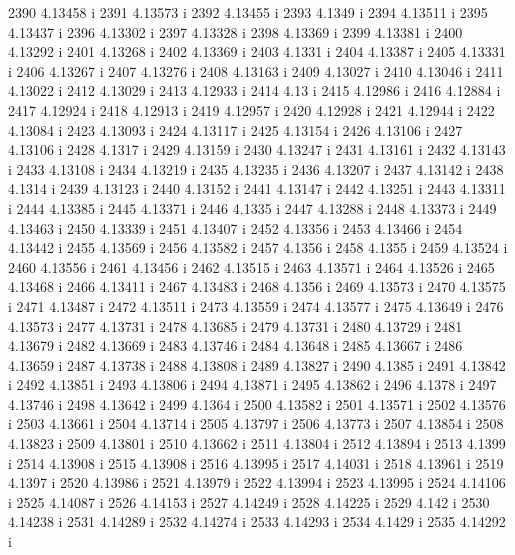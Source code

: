  2390  4.13458  i
 2391  4.13573  i
 2392  4.13455  i
 2393  4.1349  i
 2394  4.13511  i
 2395  4.13437  i
 2396  4.13302  i
 2397  4.13328  i
 2398  4.13369  i
 2399  4.13381  i
 2400  4.13292  i
 2401  4.13268  i
 2402  4.13369  i
 2403  4.1331  i
 2404  4.13387  i
 2405  4.13331  i
 2406  4.13267  i
 2407  4.13276  i
 2408  4.13163  i
 2409  4.13027  i
 2410  4.13046  i
 2411  4.13022  i
 2412  4.13029  i
 2413  4.12933  i
 2414  4.13  i
 2415  4.12986  i
 2416  4.12884  i
 2417  4.12924  i
 2418  4.12913  i
 2419  4.12957  i
 2420  4.12928  i
 2421  4.12944  i
 2422  4.13084  i
 2423  4.13093  i
 2424  4.13117  i
 2425  4.13154  i
 2426  4.13106  i
 2427  4.13106  i
 2428  4.1317  i
 2429  4.13159  i
 2430  4.13247  i
 2431  4.13161  i
 2432  4.13143  i
 2433  4.13108  i
 2434  4.13219  i
 2435  4.13235  i
 2436  4.13207  i
 2437  4.13142  i
 2438  4.1314  i
 2439  4.13123  i
 2440  4.13152  i
 2441  4.13147  i
 2442  4.13251  i
 2443  4.13311  i
 2444  4.13385  i
 2445  4.13371  i
 2446  4.1335  i
 2447  4.13288  i
 2448  4.13373  i
 2449  4.13463  i
 2450  4.13339  i
 2451  4.13407  i
 2452  4.13356  i
 2453  4.13466  i
 2454  4.13442  i
 2455  4.13569  i
 2456  4.13582  i
 2457  4.1356  i
 2458  4.1355  i
 2459  4.13524  i
 2460  4.13556  i
 2461  4.13456  i
 2462  4.13515  i
 2463  4.13571  i
 2464  4.13526  i
 2465  4.13468  i
 2466  4.13411  i
 2467  4.13483  i
 2468  4.1356  i
 2469  4.13573  i
 2470  4.13575  i
 2471  4.13487  i
 2472  4.13511  i
 2473  4.13559  i
 2474  4.13577  i
 2475  4.13649  i
 2476  4.13573  i
 2477  4.13731  i
 2478  4.13685  i
 2479  4.13731  i
 2480  4.13729  i
 2481  4.13679  i
 2482  4.13669  i
 2483  4.13746  i
 2484  4.13648  i
 2485  4.13667  i
 2486  4.13659  i
 2487  4.13738  i
 2488  4.13808  i
 2489  4.13827  i
 2490  4.1385  i
 2491  4.13842  i
 2492  4.13851  i
 2493  4.13806  i
 2494  4.13871  i
 2495  4.13862  i
 2496  4.1378  i
 2497  4.13746  i
 2498  4.13642  i
 2499  4.1364  i
 2500  4.13582  i
 2501  4.13571  i
 2502  4.13576  i
 2503  4.13661  i
 2504  4.13714  i
 2505  4.13797  i
 2506  4.13773  i
 2507  4.13854  i
 2508  4.13823  i
 2509  4.13801  i
 2510  4.13662  i
 2511  4.13804  i
 2512  4.13894  i
 2513  4.1399  i
 2514  4.13908  i
 2515  4.13908  i
 2516  4.13995  i
 2517  4.14031  i
 2518  4.13961  i
 2519  4.1397  i
 2520  4.13986  i
 2521  4.13979  i
 2522  4.13994  i
 2523  4.13995  i
 2524  4.14106  i
 2525  4.14087  i
 2526  4.14153  i
 2527  4.14249  i
 2528  4.14225  i
 2529  4.142  i
 2530  4.14238  i
 2531  4.14289  i
 2532  4.14274  i
 2533  4.14293  i
 2534  4.1429  i
 2535  4.14292  i
